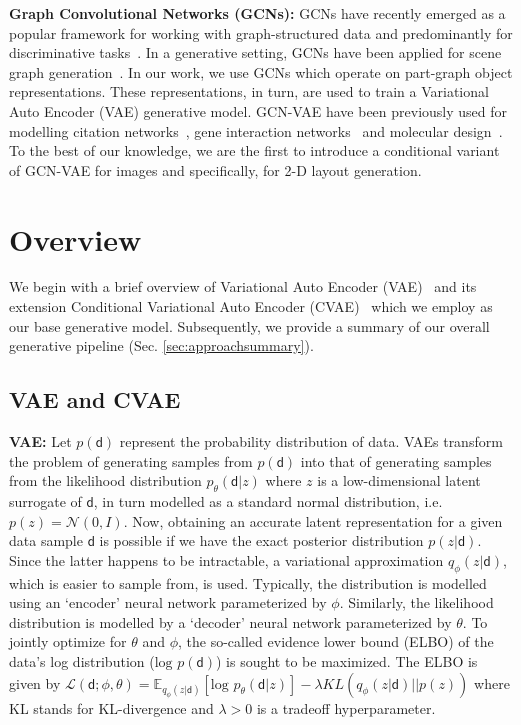 \documentclass[runningheads]{llncs}
\begin{document}
\noindent \textbf{Graph Convolutional Networks (GCNs):} GCNs have recently emerged as a popular framework for working with graph-structured data and predominantly for discriminative tasks~\cite{zhangdual,verma2018feastnet,yang2019auto,zhao2019semantic}. In a generative setting, GCNs have been applied for scene graph generation~\cite{yang2018graph,gu2019scene}. In our work, we use GCNs which operate on part-graph object representations. These representations, in turn, are used to train a Variational Auto Encoder (VAE) generative model. GCN-VAE have been previously used for modelling citation networks~\cite{kipf2016variational,yang2018meta}, gene interaction networks~\cite{yang2018meta} and molecular design~\cite{liu2018constrained}. To the best of our knowledge, we are the first to introduce a conditional variant of GCN-VAE for images and specifically, for 2-D layout generation.

\section{Overview}
\label{sec:overview}

We begin with a brief overview of Variational Auto Encoder (VAE)~\cite{kingma2013auto} and its extension Conditional Variational Auto Encoder (CVAE)~\cite{sohn2015learning} which we employ as our base generative model. Subsequently, we provide a summary of our overall generative pipeline (Sec. \ref{sec:approachsummary}).

\subsection{VAE and CVAE}
\label{sec:vae}

\noindent \textbf{VAE:} Let $p(\mathsf{d})$ represent the probability distribution of data. VAEs transform the problem of generating samples from $p(\mathsf{d})$ into that of generating samples from the likelihood distribution $p_{\theta}(\mathsf{d}|z)$ where $z$ is a low-dimensional latent surrogate of $\mathsf{d}$, in turn modelled as a standard normal distribution, i.e. $p(z) = \mathcal{N}(0,I)$. Now, obtaining an accurate latent representation for a given data sample $\mathsf{d}$ is possible if we have the exact posterior distribution  $p(z|\mathsf{d})$. Since the latter happens to be intractable, a variational approximation $q_{\phi}(z|\mathsf{d})$, which is easier to sample from, is used. Typically, the distribution is modelled using an `encoder' neural network parameterized by $\phi$. Similarly, the likelihood distribution is modelled by a `decoder' neural network parameterized by $\theta$. To jointly optimize for $\theta$ and $\phi$, the so-called evidence lower bound (ELBO) of the data's log distribution ($\text{log } p(\mathsf{d})$) is sought to be maximized. The ELBO is given by $\mathcal{L}(\mathsf{d};\phi,\theta) = \mathbb{E}_{q_{\phi}(z|\mathsf{d})} [\text{log } p_{\theta}(\mathsf{d}|z)] - \lambda KL(q_{\phi}(z|\mathsf{d})\lvert \lvert p(z))$ where KL stands for KL-divergence and $\lambda >0$ is a tradeoff hyperparameter.
\end{document}
